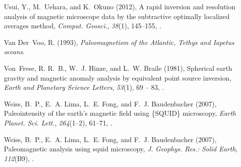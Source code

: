 \documentclass[draft,gc]{agutex}
\begin{document}
\begin{article}
\begin{thebibliography}{39}
Usui, Y., M.~Uehara, and K.~Okuno (2012), A rapid inversion and resolution
  analysis of magnetic microscope data by the subtractive optimally localized
  averages method, \textit{Comput. Geosci.}, \textit{38}(1), 145--155,
  .

Van Der~Voo, R. (1993), \textit{Paleomagnetism of the Atlantic, Tethys and
  Iapetus oceans}.

Von~Frese, R. R.~B., W.~J. Hinze, and L.~W. Braile (1981), Spherical earth
  gravity and magnetic anomaly analysis by equivalent point source inversion,
  \textit{Earth and Planetary Science Letters}, \textit{53}(1), 69 -- 83,
  .

Weiss, B.~P., E.~A. Lima, L.~E. Fong, and F.~J. Baudenbacher
  (2007{}), Paleointensity of the earth's magnetic field using
  \{SQUID\} microscopy, \textit{Earth Planet. Sci. Lett.}, \textit{264}(1–2),
  61--71, .

Weiss, B.~P., E.~A. Lima, L.~E. Fong, and F.~J. Baudenbacher
  (2007{}), Paleomagnetic analysis using squid microscopy,
  \textit{J. Geophys. Res.: Solid Earth}, \textit{112}(B9),
  .

\end{thebibliography}



%

%
%
\end{article}
\end{document}
